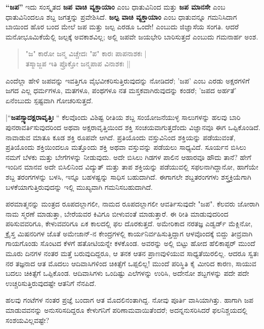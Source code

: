 \textbf{“ಜಪ”} ಇದು ಸಂಸ್ಕೃತದ \textbf{ಜಪ ವಾಚಿ ವ್ಯಕ್ತಾಯಾಂ} ಎಂಬ ಧಾತುವಿನಿಂದ ಮತ್ತು \textbf{ಜಪ ಮಾನಸೇ} ಎಂಬ ಧಾತುವಿನಿಂದಲೂ ಶಬ್ದ ಜಗತ್ತನ್ನು ಪ್ರವೇಶಿಸಿದೆ. \textbf{ಜಲ್ಪ ವಾಚಿ ವ್ಯಕ್ತಾಯಾಂ} ಎಂಬ ಧಾತುವನ್ನೂ ಗಮನಿಸಿದಾಗ ಬಾಯಿಂದ ಹೊರ ಬಂದ ಮೇಲೆ ಜಪ ಮತ್ತು ಜಲ್ಪ ಎರಡೂ ಒಂದೇ! ಎಂಬುದು ಜಿಜ್ಞಾಸೆಯ ಸಂಗತಿ. ಆದರೆ ಮನೋಭೂಮಿಕೆಯೆಲ್ಲಿ ಜಲ್ಪಕ್ಕೆ ಅವಕಾಶವಿಲ್ಲ; ಅಲ್ಲಿ ಜಪವೇ ಜಯಭೇರಿ ಬಾರಿಸುತ್ತದೆ ಎಂಬುದು ಗಮನಾರ್ಹ ಅಂಶ.
\begin{verse}
"ಜ" ಕಾರೋ ಜನ್ಮ ವಿಚ್ಚೇದಃ "ಪ" ಕಾರಃ ಪಾಪನಾಶಕಃ |\\
ತಸ್ಮಾಜ್ಜಪ ಇತಿ ಪ್ರೊಕ್ತೋ ಜನ್ಮಪಾಪ ವಿನಾಶಕಃ ||
\end{verse}
ಎಂದೆಲ್ಲಾ ಹೇಳಿ ಜಪವನ್ನು ಇವತ್ತಿಗೂ ವೈಭವೀಕರಿಸುತ್ತಿರುವುದನ್ನು ನೋಡಿದರೆ; ’ಜಪ’ ಎಂಬ ಎರಡು ಅಕ್ಷರಗಳಿಗೆ ಜಗದ ಎಲ್ಲ ಧರ್ಮಗಳೂ, ಮತಗಳೂ, ಪಂಥಗಳೂ ನತ ಮಸ್ತಕವಾಗಿರುವುದನ್ನು ಕಂಡರೆ; ’ಜಪದ ಅರ್ಹತೆ’ ಏನೆಂಬುದು ಸ್ಪಷ್ಟವಾಗಿ ಗೋಚರಿಸುತ್ತದೆ.

|“\textbf{ಜಪಸ್ಸ್ಯಾದಕ್ಷರಾವೃತ್ತಿಃ} “ ಕೆಲವೊಂದು ವಿಶಿಷ್ಟ ರೀತಿಯ ಶಬ್ದ ಸಂಯೋಜನೆಯುಳ್ಳ ಸಾಲುಗಳನ್ನು ಹಲವು ಬಾರಿ ಪುನರಾವರ್ತಿಸುವುದರಿಂದ ಅಥವಾ ಅಕ್ಷರಾವೃತ್ತಿಯಿಂದ ಶಕ್ತಿ ಸಂಚಯವಾಗುತ್ತದೆಂದು ವಿಜ್ಞಾನವೂ ಈಗ ಒಪ್ಪಿಕೊಂಡಿದೆ. ನಾವಾಡುವ ಮಾತೂ ಕೂಡ ಶಕ್ತಿ ರೂಪವೇ ಆಗಿದೆ. ಪ್ರತಿಯೊಂದು ವಸ್ತುವಿನಿಂದ ಶಕ್ತಿಯನ್ನು ಪಡೆಯುವಂತೆ, ಪ್ರತಿಯೊಂದು ಶಕ್ತಿಯಿಂದಲೂ ಮತ್ತೊಂದು ಶಕ್ತಿ ಅಥವಾ ವಸ್ತುವನ್ನು ಪಡೆಯಲು ಸಾಧ್ಯವಿದೆ. ಸೂರ್ಯನ ಬಿಸಿಲು ನಮಗೆ ಬೆಳಕು ಮತ್ತು ಬೇಗೆಗಳನ್ನು ನೀಡುವುದು. ಅದೇ ಬಿಸಿಲು ಗಿಡಗಳ ಪಾಲಿನ ಆಹಾರವೂ ಹೌದು ತಾನೆ? ಹೇಗೆ ಇಂದಿನ ಮಾನವ ಅದೇ ಬಿಸಿಲಿನಿಂದ ವಿದ್ಯುತ್ ಮತ್ತು ತಾಪ ಶಕ್ತಿಯನ್ನು ಪಡೆಯುವಲ್ಲಿ ಸಫಲನಾಗಿದ್ದಾನೋ, ಹಾಗೆಯೇ ಶಬ್ದ ತರಂಗಗಳನ್ನು ಬಳಸಿ, ಇನ್ನೂ ಬಹಳಷ್ಟನ್ನು ಸಾಧಿಸ ಬಹುದಾಗಿದೆ. ಈಗಾಗಲೇ ಶಬ್ದತರಂಗಗಳು ಶಸ್ತ್ರಕ್ರಿಯೆಗಾಗಿ ಬಳಕೆಯಾಗುತ್ತಿರುವುದನ್ನು ಇಲ್ಲಿ ಮುಖ್ಯವಾಗಿ ಗಮನಿಸಬಹುದಾಗಿದೆ.

ಪರಮಾತ್ಮನನ್ನು ಮಂತ್ರದ ರೂಪದಲ್ಲಾಗಲೀ, ನಾಮದ ರೂಪದಲ್ಲಾಗಲೀ ಆವರ್ತಿಸುವುದೇ "ಜಪ". ಕೆಲವರು ಜೋರಾಗಿ ನಾಮ ಸ್ಮರಣೆ ಮಾಡುತ್ತಾ, ಬೇರೆಯವರ ಕಿವಿಗೂ ಬೀಳುವಂತೆ ಮಾಡುತ್ತಾರೆ. ಈ ರೀತಿ ಮಾಡುವುದರಿಂದ ಪಠಿಸುವವರಿಗೂ, ಕೇಳುವವರಿಗೂ ಏಕ ಕಾಲದಲ್ಲಿ ಫಲ ದೊರಕುತ್ತದೆ. ಅಮೇರಿಕಾದ ನರತಜ್ಞ ಎಡ್ವರ್ಡ್ ಮೆಕ್ಲಿನೋ, ಕ್ರೈಸ್ತ ಮಿಷನರಿಗಳ ಜೊತೆ ಅಮೇಜಾನ್-ನ ಕೇಂದ್ರಗಳಲ್ಲಿ ಕಾರ್ಯನಿರ್ವಹಿಸುತ್ತಿದ್ದಾಗ ಆಳವೊಂದಕ್ಕೆ ಬಿದ್ದು ತೀವ್ರವಾಗಿ ಗಾಯಗೊಂಡು ಸೊಂಟದ ಕೆಳಗೆ ಹತೋಟಿಯನ್ನೇ ಕಳಕೊಂಡ. ಅವರನ್ನು ಅಲ್ಲಿ ಬಿಟ್ಟು ಹೋದ ಹೆಲಿಕಾಪ್ಟರ್ ಮುಂದೆ ಮೂರು ದಿನಗಳ ನಂತರ ಮತ್ತೆ ಬರುವುದಿದ್ದರೂ, ಆ ತನಕ ಆತನ ಪ್ರಾಣವುಳಿಯುವ ಸಾಧ್ಯತೆಯಿರಲಿಲ್ಲ. ಆದರೂ ಸ್ವತಃ ನರ ತಜ್ಞನಾದ ಆತ ಮೊದಲು ಆದಿವಾಸಿಗಳಿಂದ ಚಿಕಿತ್ಸೆಗೆ ಒಪ್ಪಲಿಲ್ಲ! ಮುಂದೆ ಪರಿಸ್ಥಿತಿ ಕೈ ಮೀರಿದ ಕಾರಣ, ಸಾಯುವ ಬದಲು ಚಿಕಿತ್ಸೆಗೆ ಒಪ್ಪಿಕೊಂಡ. ಆದಿವಾಸಿಗಳು ಒಂದಿಷ್ಟು ಎಲೆಗಳನ್ನು ಉರಿಸಿ, ಅದೇನೋ ಶಬ್ದಗಳನ್ನು ಪದೇ ಪದೇ ಉಚ್ಚರಿಸುತ್ತಿರುವುದಷ್ಟೇ ಆತನಿಗೆ ನೆನಪಿದೆ. 

ಹಲವು ಗಂಟೆಗಳ ನಂತರ ಪ್ರಜ್ಞೆ ಬಂದಾಗ ಆತ ಮೊದಲಿನಂತಾಗಿದ್ದ. ನೋವು ಪೂರ್ತಿ ವಾಸಿಯಾಗಿತ್ತು. ಹಾಗಾಗಿ ಜಪ ಮಾಡುವವನನ್ನು ಅನುಸರಿಸದಿದ್ದರೂ ಕೇಳುಗನಿಗೆ ಪರಿಣಾಮವಾಯಿತೆಂದರೆ; ಅದನ್ನನುಸರಿಸಿದರೆ ಫಲನಿಶ್ಚಯದಲ್ಲಿ ಸಂಶಯವಿಲ್ಲವಷ್ಟೇ?

